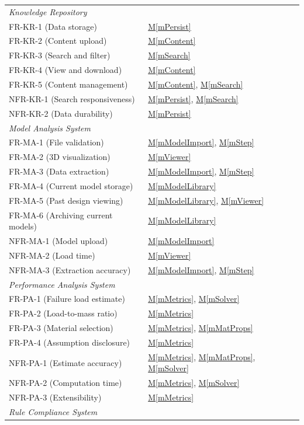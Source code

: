 \documentclass[12pt, titlepage]{article}
\newcommand{\mref}[1]{\hyperref[#1:dec]{M\ref*{#1}}}
\begin{document}
\begin{longtable}{p{} p{}}
\midrule
\multicolumn{2}{l}{\emph{Knowledge Repository}}\\
FR-KR-1 (Data storage) & \mref{mPersist}\\
FR-KR-2 (Content upload) & \mref{mContent}\\
FR-KR-3 (Search and filter) & \mref{mSearch}\\
FR-KR-4 (View and download) & \mref{mContent}\\
FR-KR-5 (Content management) & \mref{mContent}, \mref{mSearch}\\
NFR-KR-1 (Search responsiveness) & \mref{mPersist}, \mref{mSearch}\\
NFR-KR-2 (Data durability) & \mref{mPersist}\\
\midrule
\multicolumn{2}{l}{\emph{Model Analysis System}}\\
FR-MA-1 (File validation) & \mref{mModelImport}, \mref{mStep}\\
FR-MA-2 (3D visualization) & \mref{mViewer}\\
FR-MA-3 (Data extraction) & \mref{mModelImport}, \mref{mStep}\\
FR-MA-4 (Current model storage) & \mref{mModelLibrary}\\
FR-MA-5 (Past design viewing) & \mref{mModelLibrary}, \mref{mViewer}\\
FR-MA-6 (Archiving current models) & \mref{mModelLibrary}\\
NFR-MA-1 (Model upload) & \mref{mModelImport}\\
NFR-MA-2 (Load time) & \mref{mViewer}\\
NFR-MA-3 (Extraction accuracy) & \mref{mModelImport}, \mref{mStep}\\
\midrule
\multicolumn{2}{l}{\emph{Performance Analysis System}}\\
FR-PA-1 (Failure load estimate) & \mref{mMetrics}, \mref{mSolver}\\
FR-PA-2 (Load-to-mass ratio) & \mref{mMetrics}\\
FR-PA-3 (Material selection) & \mref{mMetrics}, \mref{mMatProps}\\
FR-PA-4 (Assumption disclosure) & \mref{mMetrics}\\
NFR-PA-1 (Estimate accuracy) & \mref{mMetrics}, \mref{mMatProps}, \mref{mSolver}\\
NFR-PA-2 (Computation time) & \mref{mMetrics}, \mref{mSolver}\\
NFR-PA-3 (Extensibility) & \mref{mMetrics}\\
\midrule
\multicolumn{2}{l}{\emph{Rule Compliance System}}\\

\end{longtable}
\end{document}
